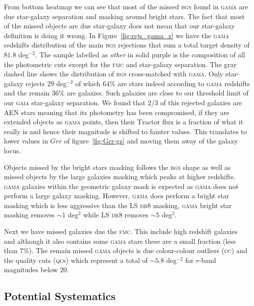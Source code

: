 \documentclass[fleqn,usenatbib]{mnras}
\newcommand{\BGS}{\textsc{bgs}\xspace}
\newcommand{\CC}{\textsc{cc}\xspace}
\newcommand{\DReight}{\textsc{dr8}\xspace}
\newcommand{\FMC}{{\textsc{fmc}}\xspace}
\newcommand{\GAMA}{\textsc{gama}\xspace}
\newcommand{\GAIA}{\textsc{gaia}\xspace}
\newcommand{\QCs}{\textsc{qc}s\xspace}
\newcommand{\TRACTOR}{\textsc{T}ractor\xspace}
\begin{document}
From bottom heatmap we can see that most of the missed \BGS found in \GAMA are due star-galaxy separation and masking around bright stars. The fact that most of the missed objects are due star-galaxy does not mean that our star-galaxy definition is doing it wrong. In Figure~\ref{fig:rejs_gama_z} we have the \GAMA redshifts distribution of the main \BGS rejections that sum a total target density of $81.8$ deg$^{-2}$. The sample labelled as {\it other} in solid purple is the composition of all the photometric cuts except for the \FMC and star-galaxy separation. The gray dashed line shows the distribution of \BGS cross-matched with \GAMA. Only star-galaxy rejects $29$ deg$^{-2}$ of which $64 \%$ are stars indeed according to \GAMA redshifts and the remain $36 \%$ are galaxies. Such galaxies are close to our threshold limit of our \GAIA star-galaxy separation. We found that $2/3$ of this rejected galaxies are AEN stars meaning that its photometry has been compromised, if they are extended objects as \GAMA points, then their \TRACTOR flux is a fraction of what it really is and hence their magnitude is shifted to fainter values. This translates to lower values in $Grr$ of figure~\ref{fig:Grr-gz} and moving them away of the galaxy locus.

Objects missed by the bright stars masking follows the \BGS shape as well as missed objects by the large galaxies masking which peaks at higher redshifts. \GAMA galaxies within the geometric galaxy mask is expected as \GAMA does not perform a large galaxy masking. However, \GAMA does perform a bright star masking which is less aggressive than the LS \DReight masking, \GAMA bright star masking removes $\sim 1$ deg$^2$ \citep{10.1111/j.1365-2966.2010.16282.x} while LS \DReight removes $\sim 5$ deg$^2$.

Next we have missed galaxies due the \FMC. This include high redshift galaxies and although it also contains some \GAMA stars these are a small fraction (less than $7 \%$). The remain missed \GAMA objects is due colour-colour outliers (\CC) and the quality cuts (\QCs) which represent a total of $\sim 5.8$ deg$^{-2}$ for $r$-band magnitudes below $20$.


\subsection{Potential Systematics}
\end{document}
